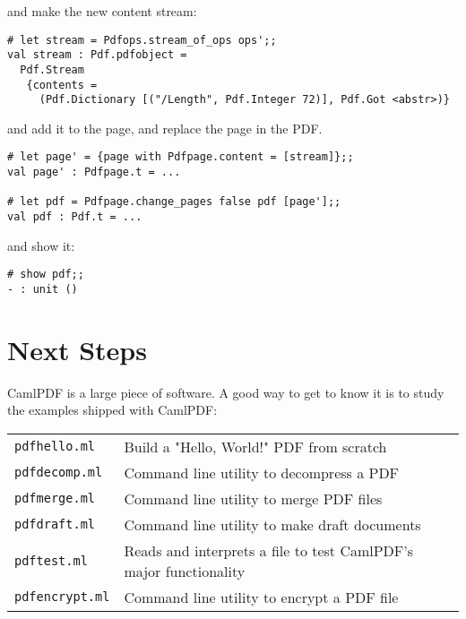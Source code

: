 \documentclass[a4paper]{memoir}
\newcommand{\smallgap}{\vspace{4mm}}
\begin{document}
\noindent and make the new content stream:

\begin{framed}
\small\begin{verbatim}
# let stream = Pdfops.stream_of_ops ops';;
val stream : Pdf.pdfobject =
  Pdf.Stream
   {contents =
     (Pdf.Dictionary [("/Length", Pdf.Integer 72)], Pdf.Got <abstr>)}
\end{verbatim}
\end{framed}

\noindent and add it to the page, and replace the page in the PDF.

\begin{framed}
\small\begin{verbatim}
# let page' = {page with Pdfpage.content = [stream]};;
val page' : Pdfpage.t = ...

# let pdf = Pdfpage.change_pages false pdf [page'];;
val pdf : Pdf.t = ...
\end{verbatim}
\end{framed}

\noindent and show it:

\begin{framed}
\small\begin{verbatim}
# show pdf;;
- : unit ()
\end{verbatim}
\end{framed}

\section*{Next Steps}

\noindent CamlPDF is a large piece of software. A good way to get to know it is to study the examples shipped with \textsf{CamlPDF}:
\smallgap

{\centering\small
\begin{tabular}{ll}
\texttt{pdfhello.ml} & Build a "Hello, World!" PDF from scratch\\
\texttt{pdfdecomp.ml} & Command line utility to decompress a PDF\\
\texttt{pdfmerge.ml} & Command line utility to merge PDF files\\
\texttt{pdfdraft.ml} & Command line utility to make draft documents\\
\texttt{pdftest.ml} & Reads and interprets a file to test CamlPDF's major functionality\\
\texttt{pdfencrypt.ml} & Command line utility to encrypt a PDF file\\
\end{tabular}
}
\end{document}

